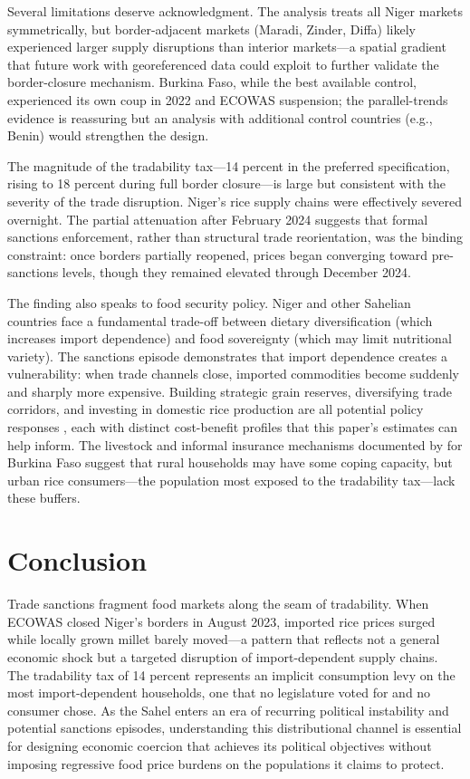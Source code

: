 \documentclass[12pt]{article}
\begin{document}
Several limitations deserve acknowledgment. The analysis treats all Niger markets symmetrically, but border-adjacent markets (Maradi, Zinder, Diffa) likely experienced larger supply disruptions than interior markets---a spatial gradient that future work with georeferenced data could exploit to further validate the border-closure mechanism. Burkina Faso, while the best available control, experienced its own coup in 2022 and ECOWAS suspension; the parallel-trends evidence is reassuring but an analysis with additional control countries (e.g., Benin) would strengthen the design.

The magnitude of the tradability tax---14 percent in the preferred specification, rising to 18 percent during full border closure---is large but consistent with the severity of the trade disruption. Niger's rice supply chains were effectively severed overnight. The partial attenuation after February 2024 suggests that formal sanctions enforcement, rather than structural trade reorientation, was the binding constraint: once borders partially reopened, prices began converging toward pre-sanctions levels, though they remained elevated through December 2024.

The finding also speaks to food security policy. Niger and other Sahelian countries face a fundamental trade-off between dietary diversification (which increases import dependence) and food sovereignty (which may limit nutritional variety). The sanctions episode demonstrates that import dependence creates a vulnerability: when trade channels close, imported commodities become suddenly and sharply more expensive. Building strategic grain reserves, diversifying trade corridors, and investing in domestic rice production are all potential policy responses \citep{christiaensen2011}, each with distinct cost-benefit profiles that this paper's estimates can help inform. The livestock and informal insurance mechanisms documented by \citet{kazianga2014} for Burkina Faso suggest that rural households may have some coping capacity, but urban rice consumers---the population most exposed to the tradability tax---lack these buffers.

\section{Conclusion}

Trade sanctions fragment food markets along the seam of tradability. When ECOWAS closed Niger's borders in August 2023, imported rice prices surged while locally grown millet barely moved---a pattern that reflects not a general economic shock but a targeted disruption of import-dependent supply chains. The tradability tax of 14 percent represents an implicit consumption levy on the most import-dependent households, one that no legislature voted for and no consumer chose. As the Sahel enters an era of recurring political instability and potential sanctions episodes, understanding this distributional channel is essential for designing economic coercion that achieves its political objectives without imposing regressive food price burdens on the populations it claims to protect.
\end{document}

